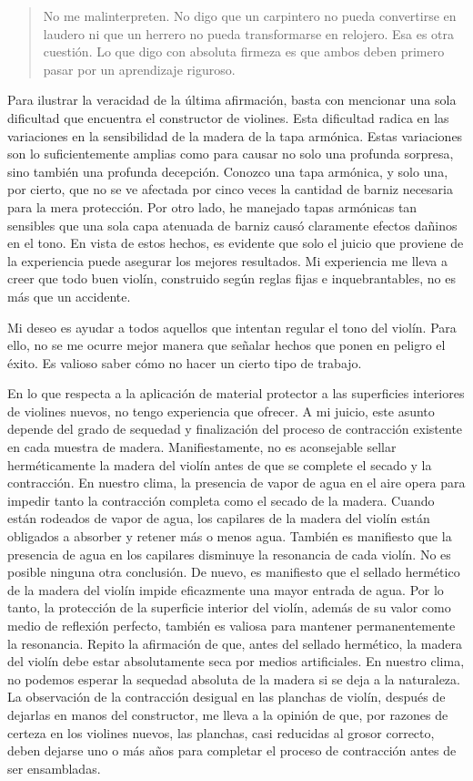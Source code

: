\documentclass[12pt]{book}
\begin{document}
\begin{quote}
No me malinterpreten. No digo que un carpintero no pueda convertirse en laudero ni que un herrero no pueda transformarse en relojero. Esa es otra cuestión. Lo que digo con absoluta firmeza es que ambos deben primero pasar por un aprendizaje riguroso.
\end{quote}

Para ilustrar la veracidad de la última afirmación, basta con mencionar una sola dificultad que encuentra el constructor de violines. Esta dificultad radica en las variaciones en la sensibilidad de la madera de la tapa armónica. Estas variaciones son lo suficientemente amplias como para causar no solo una profunda sorpresa, sino también una profunda decepción. Conozco una tapa armónica, y solo una, por cierto, que no se ve afectada por cinco veces la cantidad de barniz necesaria para la mera protección. Por otro lado, he manejado tapas armónicas tan sensibles que una sola capa atenuada de barniz causó claramente efectos dañinos en el tono. En vista de estos hechos, es evidente que solo el juicio que proviene de la experiencia puede asegurar los mejores resultados. Mi experiencia me lleva a creer que todo buen violín, construido según reglas fijas e inquebrantables, no es más que un accidente.

Mi deseo es ayudar a todos aquellos que intentan regular el tono del violín. Para ello, no se me ocurre mejor manera que señalar hechos que ponen en peligro el éxito. Es valioso saber cómo no hacer un cierto tipo de trabajo.

En lo que respecta a la aplicación de material protector a las superficies interiores de violines nuevos, no tengo experiencia que ofrecer. A mi juicio, este asunto depende del grado de sequedad y finalización del proceso de contracción existente en cada muestra de madera. Manifiestamente, no es aconsejable sellar herméticamente la madera del violín antes de que se complete el secado y la contracción. En nuestro clima, la presencia de vapor de agua en el aire opera para impedir tanto la contracción completa como el secado de la madera. Cuando están rodeados de vapor de agua, los capilares de la madera del violín están obligados a absorber y retener más o menos agua. También es manifiesto que la presencia de agua en los capilares disminuye la resonancia de cada violín. No es posible ninguna otra conclusión. De nuevo, es manifiesto que el sellado hermético de la madera del violín impide eficazmente una mayor entrada de agua. Por lo tanto, la protección de la superficie interior del violín, además de su valor como medio de reflexión perfecto, también es valiosa para mantener permanentemente la resonancia. Repito la afirmación de que, antes del sellado hermético, la madera del violín debe estar absolutamente seca por medios artificiales. En nuestro clima, no podemos esperar la sequedad absoluta de la madera si se deja a la naturaleza. La observación de la contracción desigual en las planchas de violín, después de dejarlas en manos del constructor, me lleva a la opinión de que, por razones de certeza en los violines nuevos, las planchas, casi reducidas al grosor correcto, deben dejarse uno o más años para completar el proceso de contracción antes de ser ensambladas.
\end{document}

